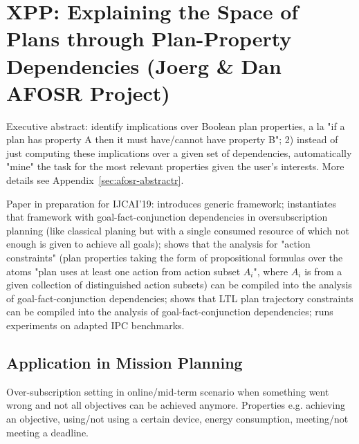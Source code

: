 \section{XPP: Explaining the Space of Plans through Plan-Property Dependencies (Joerg \& Dan AFOSR Project)}
\label{xpp}

Executive abstract: identify implications over Boolean plan properties, a la "if a plan has property A then it must have/cannot have property B"; 2) instead of just computing these implications over a given set of dependencies, automatically "mine" the task for the most relevant properties given the user's interests. More details see Appendix~\ref{sec:afosr-abstractr}.

Paper in preparation for IJCAI'19: introduces generic framework; instantiates that framework with goal-fact-conjunction dependencies in oversubscription planning (like classical planing but with a single consumed resource of which not enough is given to achieve all goals); shows that the analysis for "action constraints" (plan properties taking the form of propositional formulas over the atoms "plan uses at least one action from action subset $A_i$", where $A_i$ is from a given collection of distinguished action subsets) can be compiled into the analysis of goal-fact-conjunction dependencies; shows that LTL plan trajectory constraints can be compiled into the analysis of goal-fact-conjunction dependencies; runs experiments on adapted IPC benchmarks. 






\subsection{Application in Mission Planning}

Over-subscription setting in online/mid-term scenario when something went wrong and not all objectives can be achieved anymore. Properties e.g. achieving an objective, using/not using a certain device, energy consumption, meeting/not meeting a deadline.

